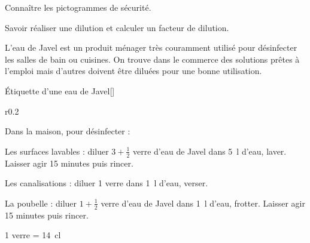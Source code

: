 \tetePremStssChim
\vspace*{-36pt}

\begin{objectifs}
  \item Connaître les pictogrammes de sécurité.
  \item Savoir réaliser une dilution et calculer un facteur de dilution.
\end{objectifs}





\newpage
\vspace*{-30pt}
\begin{contexte}
  L'eau de Javel est un produit ménager très couramment utilisé pour désinfecter les salles
de bain ou cuisines.
  On trouve dans le commerce des solutions prêtes à l’emploi mais d’autres
doivent être diluées pour une bonne utilisation.

\end{contexte}

\begin{doc}{Étiquette d'une eau de Javel}[\label{doc:eau_javel}]
  \begin{wrapfigure}{r}{0.2\linewidth}
    \vspace*{-16pt}
    \centering
    ~
  \end{wrapfigure}
  
  Dans la maison, pour désinfecter :
  \begin{listePoints}
    \item Les surfaces lavables : diluer $3 + \frac{1}{2}$ verre d’eau de Javel dans \qty{5}{\litre} d’eau, laver.
    Laisser agir 15 minutes puis rincer.
    \item Les canalisations : diluer 1 verre dans \qty{1}{\litre} d’eau, verser.
    \item La poubelle : diluer $1 + \frac{1}{2}$ verre d’eau de Javel dans \qty{1}{\litre} d’eau, frotter.
    Laisser agir 15 minutes puis rincer.
  \end{listePoints}
  \begin{donnees}
    \item \num{1} verre = \qty{14}{\centi\litre}
  \end{donnees}
\end{doc}


